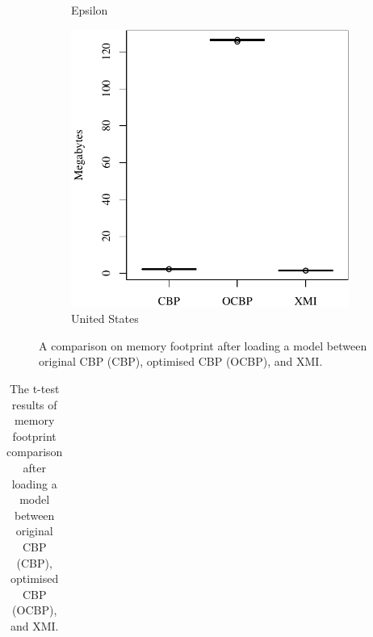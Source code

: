 \documentclass{llncs}
\begin{document}
{\begin{figure}[ht]
\begin{subfigure}{0.325\textwidth}
            \caption{Epsilon}
            \label{fig:load_memory_epsilon}
        \end{subfigure}
        \hfill
        \begin{subfigure}{0.325\textwidth}
            \centering
            \includegraphics[width=\linewidth]{images/load_memory_wikipedia}
            \caption{United States}
            \label{fig:load_memory_wikipedia}
        \end{subfigure}
        \caption{A comparison on memory footprint after loading a model between original CBP (CBP), optimised CBP (OCBP), and XMI.}
        \label{fig:loadmemory}
    \end{figure}

     \begin{table}[t]
        \small
        \centering
        \caption{The t-test results of memory footprint comparison after loading a model between original CBP (CBP), optimised CBP (OCBP), and XMI.}
        \label{table:ttest_results_load_memory}
        \begin{tabular}
            {|p{}|p{}|p{}|p{}|p{}|p{}|p{}|}
            \hline 
            

\end{tabular}
\end{table}}
\end{document}
